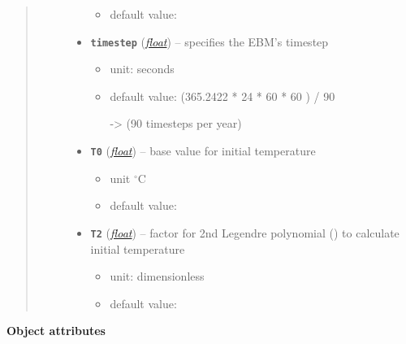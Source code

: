 \documentclass[a4paper,10pt,english]{sphinxmanual}
\begin{document}
\begin{fulllineitems}
\begin{quote}
\begin{description}
\begin{itemize}
\begin{itemize}
\item {} 
default value: 

\end{itemize}


\item {} 
\textbf{\texttt{timestep}} (\href{http://docs.python.org/2.7/library/functions.html\#float}{\emph{float}}) -- 
specifies the EBM's timestep
\begin{itemize}
\item {} 
unit: seconds

\item {} 
default value: (365.2422 * 24 * 60 * 60 ) / 90

-\textgreater{} (90 timesteps per year)

\end{itemize}


\item {} 
\textbf{\texttt{T0}} (\href{http://docs.python.org/2.7/library/functions.html\#float}{\emph{float}}) -- 
base value for initial temperature
\begin{itemize}
\item {} 
unit \(^{\circ} \textrm{C}\)

\item {} 
default value: 

\end{itemize}


\item {} 
\textbf{\texttt{T2}} (\href{http://docs.python.org/2.7/library/functions.html\#float}{\emph{float}}) -- 
factor for 2nd Legendre polynomial 
{\hyperref[api/climlab.utils:climlab.utils.legendre.P2]{\emph{}}} () 
to calculate initial temperature
\begin{itemize}
\item {} 
unit: dimensionless

\item {} 
default value: 

\end{itemize}


\end{itemize}

\end{description}\end{quote}

\textbf{Object attributes}


\end{fulllineitems}
\end{document}

